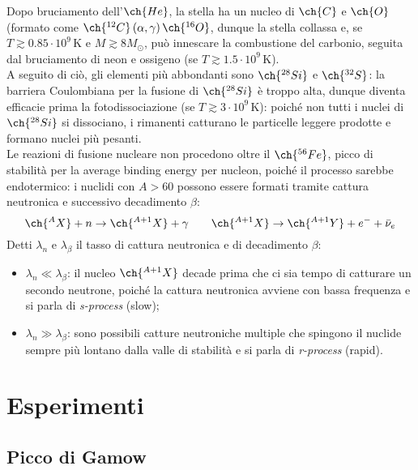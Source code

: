 Dopo bruciamento dell'$ \ch{He} $, la stella ha un nucleo di $ \ch{C} $ e $ \ch{O} $ (formato come $ \ch{^{12}C} \left( \alpha, \gamma \right) \ch{^{16}O} $, dunque la stella collassa e, se $ T \gtrsim 0.85 \cdot 10^9 \,\text{K} $ e $ M \gtrsim 8 M_\odot $, può innescare la combustione del carbonio, seguita dal bruciamento di neon e ossigeno (se $ T \gtrsim 1.5 \cdot 10^9 \,\text{K} $).\\
A seguito di ciò, gli elementi più abbondanti sono $ \ch{^{28}Si} $ e $ \ch{^{32}S} $: la barriera Coulombiana per la fusione di $ \ch{^{28}Si} $ è troppo alta, dunque diventa efficacie prima la fotodissociazione (se $ T \gtrsim 3 \cdot 10^9 \,\text{K} $): poiché non tutti i nuclei di $ \ch{^{28}Si} $ si dissociano, i rimanenti catturano le particelle leggere prodotte e formano nuclei più pesanti.\\
Le reazioni di fusione nucleare non procedono oltre il $ \ch{^{56}Fe} $, picco di stabilità per la average binding energy per nucleon, poiché il processo sarebbe endotermico: i nuclidi con $ A > 60 $ possono essere formati tramite cattura neutronica e successivo decadimento $ \beta $:
\begin{equation*}
	\ch{^A X} + n \rightarrow \ch{^{A+1} X} + \gamma
	\qquad
	\ch{^{A+1} X} \rightarrow \ch{^{A+1} Y} + e^- + \bar{\nu}_e
\end{equation*}
Detti $ \lambda_n $ e $ \lambda_\beta $ il tasso di cattura neutronica e di decadimento $ \beta $:
\begin{itemize}
	\item $ \lambda_n \ll \lambda_\beta $: il nucleo $ \ch{^{A+1} X} $ decade prima che ci sia tempo di catturare un secondo neutrone, poiché la cattura neutronica avviene con bassa frequenza e si parla di \textit{s-process} (slow);
	\item $ \lambda_n \gg \lambda_\beta $: sono possibili catture neutroniche multiple che spingono il nuclide sempre più lontano dalla valle di stabilità e si parla di \textit{r-process} (rapid).
\end{itemize}

\section{Esperimenti}

\subsection{Picco di Gamow}


